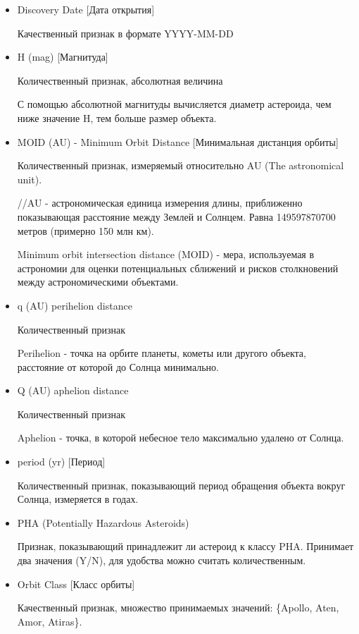 \documentclass{article}
\begin{document}
\begin{itemize}
\item {Discovery Date [Дата открытия]} 

Качественный признак в формате YYYY-MM-DD

\item {H (mag) [Магнитуда]}

Количественный признак, абсолютная величина

С помощью абсолютной магнитуды вычисляется диаметр астероида, чем ниже значение H, тем больше размер объекта.

\item {MOID (AU) - Minimum Orbit Distance [Минимальная дистанция орбиты]}

Количественный признак, измеряемый относительно AU (The astronomical unit).

//AU - астрономическая единица измерения длины, приближенно показывающая расстояние между Землей и Солнцем. Равна 149597870700 метров (примерно 150 млн км).

Minimum orbit intersection distance (MOID) - мера, используемая в астрономии для оценки потенциальных сближений и рисков столкновений между астрономическими объектами.

\item {q (AU) perihelion distance}

Количественный признак

Perihelion - точка на орбите планеты, кометы или другого объекта, расстояние от которой до Солнца минимально.

\item {Q (AU) aphelion distance}

Количественный признак

Aphelion - точка, в которой небесное тело максимально удалено от Солнца.

\item {period (yr) [Период]}

Количественный признак, показывающий период обращения объекта вокруг Солнца, измеряется в годах.


\item {PHA (Potentially Hazardous Asteroids)}

Признак, показывающий принадлежит ли астероид к классу PHA. 
Принимает два значения (Y/N), для удобства можно считать количественным. 

\item {Orbit Class [Класс орбиты]}

Качественный признак, множество принимаемых значений: \{Apollo, Aten, Amor, Atiras\}.\\[0.3cm]

\end{itemize} 
\end{document}
